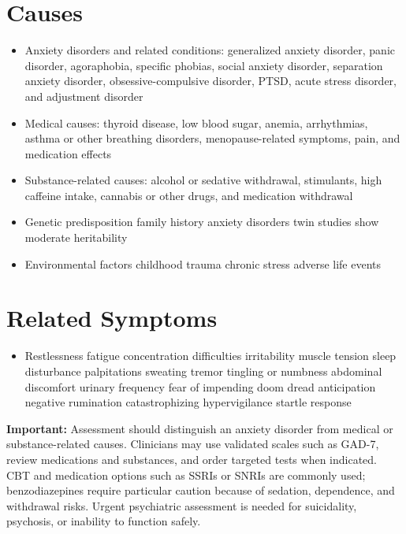 \section*{Causes}
\begin{itemize}
 \item Anxiety disorders and related conditions: generalized anxiety disorder, panic disorder, agoraphobia, specific phobias, social anxiety disorder, separation anxiety disorder, obsessive-compulsive disorder, PTSD, acute stress disorder, and adjustment disorder
 \item Medical causes: thyroid disease, low blood sugar, anemia, arrhythmias, asthma or other breathing disorders, menopause-related symptoms, pain, and medication effects
 \item Substance-related causes: alcohol or sedative withdrawal, stimulants, high caffeine intake, cannabis or other drugs, and medication withdrawal
 \item Genetic predisposition family history anxiety disorders twin studies show moderate heritability
 \item Environmental factors childhood trauma chronic stress adverse life events
\end{itemize}

\section*{Related Symptoms}
\begin{itemize}
 \item Restlessness fatigue concentration difficulties irritability muscle tension sleep disturbance palpitations sweating tremor tingling or numbness abdominal discomfort urinary frequency fear of impending doom dread anticipation negative rumination catastrophizing hypervigilance startle response
\end{itemize}
\textbf{Important:} Assessment should distinguish an anxiety disorder from medical or substance-related causes. Clinicians may use validated scales such as GAD-7, review medications and substances, and order targeted tests when indicated. CBT and medication options such as SSRIs or SNRIs are commonly used; benzodiazepines require particular caution because of sedation, dependence, and withdrawal risks. Urgent psychiatric assessment is needed for suicidality, psychosis, or inability to function safely.

